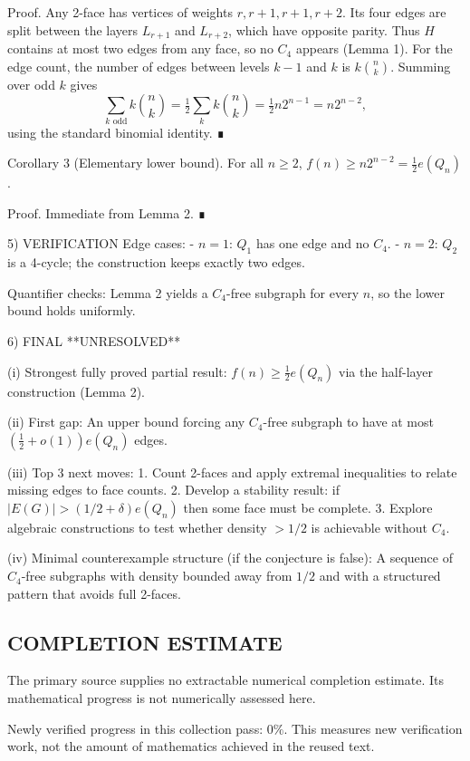 Proof.
Any 2-face has vertices of weights $r,r+1,r+1,r+2$. Its four edges are split between the layers
$L_{r+1}$ and $L_{r+2}$, which have opposite parity. Thus $H$ contains at most two edges from any
face, so no $C_4$ appears (Lemma 1). For the edge count, the number of edges between levels
$k-1$ and $k$ is $k\binom{n}{k}$. Summing over odd $k$ gives
\[\sum_{k\text{ odd}} k\binom{n}{k} = \tfrac12\sum_{k} k\binom{n}{k} = \tfrac12 n2^{n-1}=n2^{n-2},\]
using the standard binomial identity. ∎

Corollary 3 (Elementary lower bound).
For all $n\ge 2$, $f(n)\ge n2^{n-2}=\tfrac12 e(Q_n)$.

Proof.
Immediate from Lemma 2. ∎

5) VERIFICATION
Edge cases:
- $n=1$: $Q_1$ has one edge and no $C_4$.
- $n=2$: $Q_2$ is a 4-cycle; the construction keeps exactly two edges.

Quantifier checks:
Lemma 2 yields a $C_4$-free subgraph for every $n$, so the lower bound holds uniformly.

6) FINAL
**UNRESOLVED**

(i) Strongest fully proved partial result:
$f(n)\ge \tfrac12 e(Q_n)$ via the half-layer construction (Lemma 2).

(ii) First gap:
An upper bound forcing any $C_4$-free subgraph to have at most $(\tfrac12+o(1))e(Q_n)$ edges.

(iii) Top 3 next moves:
1. Count 2-faces and apply extremal inequalities to relate missing edges to face counts.
2. Develop a stability result: if $|E(G)|>(1/2+\delta)e(Q_n)$ then some face must be complete.
3. Explore algebraic constructions to test whether density $>1/2$ is achievable without $C_4$.

(iv) Minimal counterexample structure (if the conjecture is false):
A sequence of $C_4$-free subgraphs with density bounded away from $1/2$ and with a structured
pattern that avoids full 2-faces.


\subsection*{COMPLETION ESTIMATE}
The primary source supplies no extractable numerical completion estimate. Its mathematical progress is not numerically assessed here.

Newly verified progress in this collection pass: $0\%$. This measures new verification work, not the amount of mathematics achieved in the reused text.
